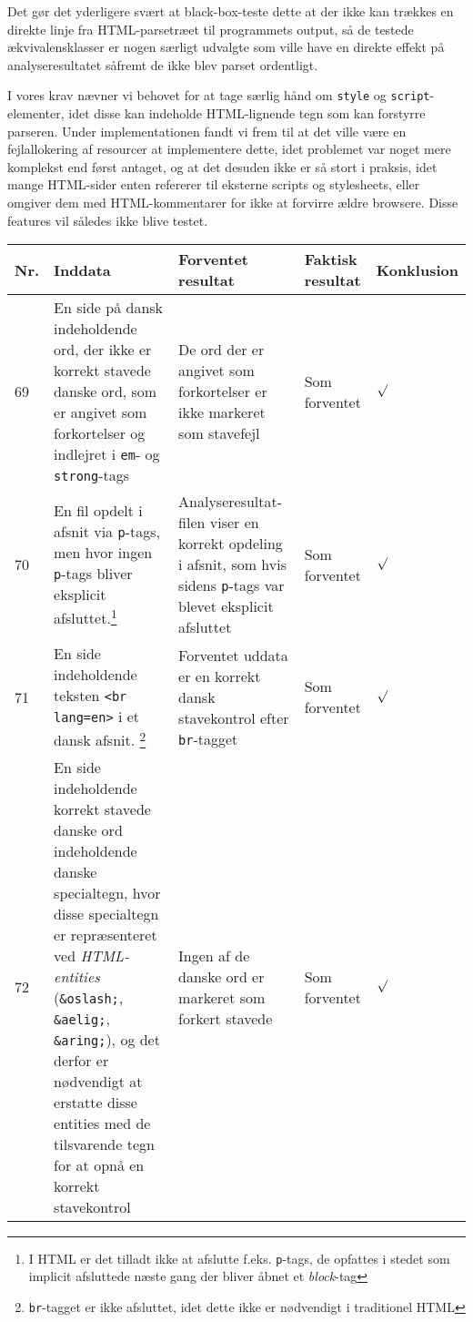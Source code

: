 \documentclass[a4paper,oneside,article]{memoir}
\begin{document}
\begin{landscape}
Det gør det yderligere svært at black-box-teste dette at der ikke kan
trækkes en direkte linje fra HTML-parsetræet til programmets output,
så de testede ækvivalensklasser er nogen særligt udvalgte som ville
have en direkte effekt på analyseresultatet såfremt de ikke blev
parset ordentligt.

I vores krav nævner vi behovet for at tage særlig hånd om
\texttt{style} og \texttt{script}-elementer, idet disse kan indeholde
HTML-lignende tegn som kan forstyrre parseren. Under implementationen
fandt vi frem til at det ville være en fejlallokering af resourcer at
implementere dette, idet problemet var noget mere komplekst end først
antaget, og at det desuden ikke er så stort i praksis, idet mange
HTML-sider enten refererer til eksterne scripts og stylesheets, eller
omgiver dem med HTML-kommentarer for ikke at forvirre ældre
browsere. Disse features vil således ikke blive testet.

\begin{longtable}[c]{p{20pt}|p{220pt}|p{130pt}|p{130pt}|p{50pt}}
\textbf{Nr.} &
\textbf{Inddata} &
\textbf{Forventet resultat} &
\textbf{Faktisk resultat} &
\textbf{Konklusion} \\ \hline

69 &
En side på dansk indeholdende ord, der ikke er korrekt stavede danske
ord, som er angivet som forkortelser og indlejret i \texttt{em}- og
\texttt{strong}-tags &
De ord der er angivet som forkortelser er ikke markeret som stavefejl &
Som forventet &
$\surd$ \\ \hline

70 &
En fil opdelt i afsnit via \texttt{p}-tags, men hvor ingen
\texttt{p}-tags bliver eksplicit afsluttet.\footnote{I HTML er det
  tilladt ikke at afslutte f.eks. \texttt{p}-tags, de opfattes i
  stedet som implicit afsluttede næste gang der bliver åbnet et
  \textit{block}-tag} &
Analyseresultat-filen viser en korrekt opdeling i afsnit, som hvis
sidens \texttt{p}-tags var blevet eksplicit afsluttet &
Som forventet &
$\surd$ \\ \hline

71 &
En side indeholdende teksten \texttt{<br lang=en>} i et dansk
afsnit. \footnote{\texttt{br}-tagget er ikke afsluttet, idet dette
  ikke er nødvendigt i traditionel HTML} &
Forventet uddata er en korrekt dansk stavekontrol efter
\texttt{br}-tagget &
Som forventet &
$\surd$ \\ \hline

72 &
En side indeholdende korrekt stavede danske ord indeholdende danske
specialtegn, hvor disse specialtegn er repræsenteret ved
\textit{HTML-entities} (\texttt{\&oslash;}, \texttt{\&aelig;},
\texttt{\&aring;}), og det derfor er nødvendigt at erstatte disse
entities med de tilsvarende tegn for at opnå en korrekt stavekontrol &
Ingen af de danske ord er markeret som forkert stavede &
Som forventet &
$\surd$ \\ \hline


\end{longtable}
\end{landscape}
\end{document}
